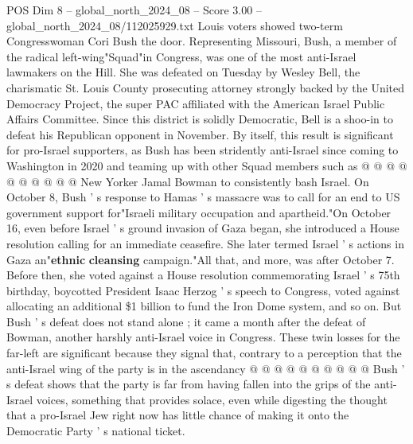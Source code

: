 \begin{textsample}{POS Dim 8 – global\_north\_2024\_08 – Score 3.00 – global\_north\_2024\_08/112025929.txt}
Louis voters showed two-term Congresswoman Cori Bush the door.
Representing Missouri, Bush, a member of the radical left-wing"Squad"in Congress, was one of the most anti-Israel lawmakers on the Hill.
She was defeated on Tuesday by Wesley Bell, the charismatic St.
Louis County prosecuting attorney strongly backed by the United Democracy Project, the super PAC affiliated with the American Israel Public Affairs Committee.
Since this district is solidly Democratic, Bell is a shoo-in to defeat his Republican opponent in November.
By itself, this result is significant for pro-Israel supporters, as Bush has been stridently anti-Israel since coming to Washington in 2020 and teaming up with other Squad members such as @ @ @ @ @ @ @ @ @ @ New Yorker Jamal Bowman to consistently bash Israel.
On October 8, Bush ' s response to Hamas ' s massacre was to call for an end to US government support for"Israeli military occupation and apartheid."On October 16, even before Israel ' s ground invasion of Gaza began, she introduced a House resolution calling for an immediate ceasefire.
She later termed Israel ' s actions in Gaza an"\textbf{ethnic} \textbf{cleansing} campaign."All that, and more, was after October 7.
Before then, she voted against a House resolution commemorating Israel ' s 75th birthday, boycotted President Isaac Herzog ' s speech to Congress, voted against allocating an additional \$1 billion to fund the Iron Dome system, and so on.
But Bush ' s defeat does not stand alone ; it came a month after the defeat of Bowman, another harshly anti-Israel voice in Congress.
These twin losses for the far-left are significant because they signal that, contrary to a perception that the anti-Israel wing of the party is in the ascendancy @ @ @ @ @ @ @ @ @ @ Bush ' s defeat shows that the party is far from having fallen into the grips of the anti-Israel voices, something that provides solace, even while digesting the thought that a pro-Israel Jew right now has little chance of making it onto the Democratic Party ' s national ticket.

\end{textsample}
